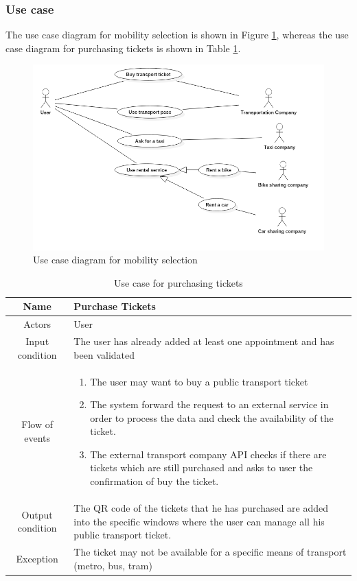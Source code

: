 \subsubsection{Use case}
The use case diagram for mobility selection is shown in Figure \ref{fig:useCaseMobility}, whereas the use case diagram for purchasing tickets is shown in Table \ref{usecase_tickets}.
\begin{figure}
	\centering
	\includegraphics[width=6in]{./diagrams/TransportationUseCase.png}
	\caption{Use case diagram for mobility selection}
	\label{fig:useCaseMobility}
\end{figure}

\begin{table}
\centering
	\begin{tabular}{|c||p{}|}
    \hline
    Name & Purchase Tickets \\ \hline
    Actors & User \\  \hline
    Input condition & The user has already added at least one appointment and has been validated \\ \hline
    Flow of events & \begin{enumerate}
    \item The user may want to buy a public transport ticket
    \item The system forward the request to an external service in order to process the data and check the availability of the ticket.
    \item The external transport company API checks if there are tickets which are still purchased and asks to user the confirmation of buy the ticket.
    \end{enumerate} \\ \hline
     Output condition & The QR code of the tickets that he has purchased are added into the specific windows where the user can manage all his public transport ticket. \\ \hline
     Exception & The ticket may not be available for a specific means of transport (metro, bus, tram) \\ \hline
	\end{tabular}
\caption{Use case for purchasing tickets}
\label{usecase_tickets}
\end{table}

